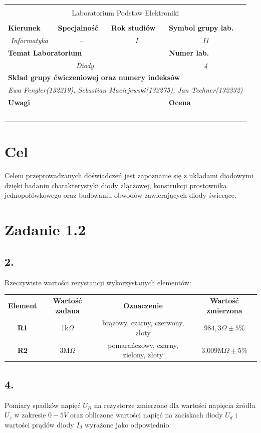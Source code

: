 \documentclass[polish,a4paper]{article}
\newcommand{\PRzFieldDsc}[1]{\sffamily\bfseries\scriptsize #1}
\newcommand{\PRzFieldCnt}[1]{\itshape #1}
\newcommand{\PRzHeading}[8]{

\begin{center}
\begin{tabular}{ p{0.32\textwidth} p{0.15\textwidth} p{0.15\textwidth} p{0.12\textwidth} p{0.12\textwidth} }

  &   &   &   &   \\
\hline
\multicolumn{5}{|c|}{}\\[-1ex]
\multicolumn{5}{|c|}{{\LARGE #1}}\\
\multicolumn{5}{|c|}{}\\[-1ex]

\hline
\multicolumn{1}{|l|}{\PRzFieldDsc{Kierunek}}	& \multicolumn{1}{|l|}{\PRzFieldDsc{Specjalność}}	& \multicolumn{1}{|l|}{\PRzFieldDsc{Rok studiów}}	& \multicolumn{2}{|l|}{\PRzFieldDsc{Symbol grupy lab.}} \\
\multicolumn{1}{|c|}{\PRzFieldCnt{#2}}		& \multicolumn{1}{|c|}{\PRzFieldCnt{#3}}		& \multicolumn{1}{|c|}{\PRzFieldCnt{#4}}		& \multicolumn{2}{|c|}{\PRzFieldCnt{#5}} \\

\hline
\multicolumn{4}{|l|}{\PRzFieldDsc{Temat Laboratorium}}		& \multicolumn{1}{|l|}{\PRzFieldDsc{Numer lab.}} \\
\multicolumn{4}{|c|}{\PRzFieldCnt{#6}}				& \multicolumn{1}{|c|}{\PRzFieldCnt{#7}} \\

\hline
\multicolumn{5}{|l|}{\PRzFieldDsc{Skład grupy ćwiczeniowej oraz numery indeksów}}\\
\multicolumn{5}{|c|}{\PRzFieldCnt{#8}}\\

\hline
\multicolumn{3}{|l|}{\PRzFieldDsc{Uwagi}}	& \multicolumn{2}{|l|}{\PRzFieldDsc{Ocena}} \\
\multicolumn{3}{|c|}{\PRzFieldCnt{\ }}		& \multicolumn{2}{|c|}{\PRzFieldCnt{\ }} \\

\hline
\end{tabular}
\end{center}
}
\begin{document}
\PRzHeading{Laboratorium Podstaw Elektroniki}{Informatyka}{--}{I}{I1}{Diody}{4}{Ewa Fengler(132219), Sebastian Maciejewski(132275), Jan Techner(132332)}{}


\section*{Cel}
Celem przeprowadzanych doświadczeń jest zapoznanie się z układami diodowymi dzięki badaniu charakterystyki diody złączowej, konstrukcji prostownika jednopołówkowego oraz budowaniu obwodów zawierających diody świecące.

\section{Zadanie 1.2}


\subsection*{2.}
Rzeczywiste wartości rezystancji wykorzystanych elementów:

\begin{center}
\begin{tabular}{|c||c|c|c|}
\hline
\textbf{Element} & \textbf{Wartość zadana} & \textbf{Oznaczenie} & \textbf{Wartość zmierzona}\\
\hhline{|=#=|=|=|}
\textbf{R1} & 1k$\Omega$ & brązowy, czarny, czerwony, złoty & $984,3\Omega\pm5\%$\\
\hline
\textbf{R2} & 3M$\Omega$ & pomarańczowy, czarny, zielony, złoty & 3,009M$\Omega\pm5\%$\\
\hline
\end{tabular}
\end{center}


\subsection*{4.}
\begin{flushleft}
Pomiary spadków napięć $U_{R}$ na rezystorze zmierzone dla wartości napięcia źródła $U_{z}$ w zakresie $0 - 5V$ oraz obliczone wartości napięć na zaciskach diody $U_{d}$ i wartości prądów diody $I_{d}$ wyrażone jako odpowiednio:
\end{flushleft}
\end{document}
